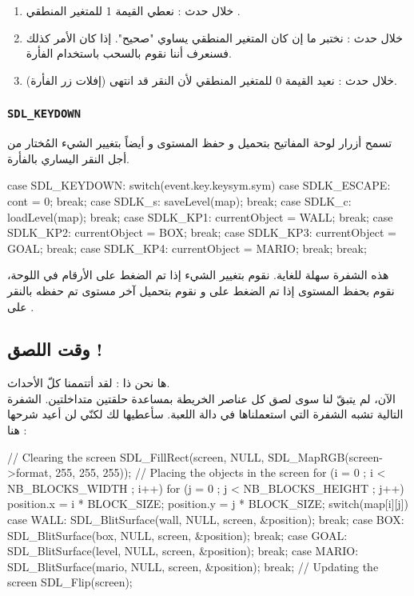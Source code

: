 \begin{enumerate}
	\item خلال حدث
	 :
	نعطي القيمة 1 للمتغير المنطقي
	.
	\item خلال حدث 
	 :
	نختبر ما إن كان المتغير المنطقي 
	يساوي "صحيح". إذا كان الأمر كذلك فسنعرف أننا نقوم بالسحب باستخدام الفأرة.
	\item  خلال حدث
	 :
	نعيد القيمة 0 للمتغير المنطقي
	لأن النقر قد انتهى (إفلات زر الفأرة).
\end{enumerate}

\subsubsection{\texttt{SDL\_KEYDOWN}}

تسمح أزرار لوحة المفاتيح بتحميل و حفظ المستوى و أيضاً بتغيير الشيء المُختار من أجل النقر اليساري بالفأرة. 

\begin{Csource}
case SDL_KEYDOWN:
switch(event.key.keysym.sym)
{
	case SDLK_ESCAPE:
		cont = 0;
		break;
	case SDLK_s:
		saveLevel(map);
		break;
	case SDLK_c:
		loadLevel(map);
		break;
	case SDLK_KP1:
		currentObject = WALL;
		break;
	case SDLK_KP2:
		currentObject = BOX;
		break;
	case SDLK_KP3:
		currentObject = GOAL;
		break;
	case SDLK_KP4:
		currentObject = MARIO;
		break;
}
break;
\end{Csource}

هذه الشفرة سهلة للغاية. نقوم بتغيير الشيء إذا تم الضغط على الأرقام في اللوحة، نقوم بحفظ المستوى إذا تم الضغط على 
و نقوم بتحميل آخر مستوى تم حفظه بالنقر على
.

\subsection{وقت اللصق !}

ها نحن ذا : لقد أتتممنا كلّ الأحداث.\\
الآن، لم يتبقّ لنا سوى لصق كل عناصر الخريطة بمساعدة حلقتين متداخلتين. الشفرة التالية تشبه الشفرة التي استعملناها في دالة اللعبة. سأعطيها لك لكنّي لن أعيد شرحها هنا :

\begin{Csource}
// Clearing the screen
SDL_FillRect(screen, NULL, SDL_MapRGB(screen->format, 255, 255, 255));
// Placing the objects in the screen
for (i = 0 ; i < NB_BLOCKS_WIDTH ; i++)
{
	for (j = 0 ; j < NB_BLOCKS_HEIGHT ; j++)
	{
		position.x = i * BLOCK_SIZE;
		position.y = j * BLOCK_SIZE;
		switch(map[i][j])
		{
			case WALL:
			SDL_BlitSurface(wall, NULL, screen, &position);
			break;
			case BOX:
			SDL_BlitSurface(box, NULL, screen, &position);
			break;
			case GOAL:
			SDL_BlitSurface(level, NULL, screen, &position);
			break;
			case MARIO:
			SDL_BlitSurface(mario, NULL, screen, &position);
			break;
		}
	}
}
// Updating the screen
SDL_Flip(screen);
\end{Csource}

